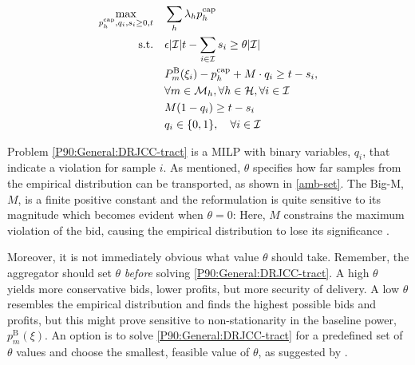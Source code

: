\documentclass[conference]{IEEEtran}
\begin{document}
\begin{subequations}\label{P90:General:DRJCC-tract}
    \begin{align}
        \max_{p_{h}^{\text{cap}}, q_i, s_i \geq 0, t} \quad & \sum_h \lambda_h p_{h}^{\text{cap}}                                                                                                                                    \\
        \text{s.t.} \quad                                   & \epsilon |\mathcal{I}| t - \sum_{i \in \mathcal{I}} s_i \geq \theta |\mathcal{I}|                                                                                      \\
                                                            & P_{m}^{\text{B}}(\xi_i) - p_{h}^{\text{cap}} + M\cdot q_i \geq t - s_i, \notag \\
                                                            &  \forall{m} \in \mathcal{M}_{h},  \forall{h} \in \mathcal{H},  \forall{i} \in \mathcal{I} \\
                                                            & M (1-q_i) \geq t - s_i                                                                                                                                                 \\
                                                            & q_i \in \{0,1 \}, \quad \forall{i} \in \mathcal{I}
    \end{align}
\end{subequations}

Problem \eqref{P90:General:DRJCC-tract} is a \ac{MILP} with binary variables, $q_{i}$, that indicate a violation for sample $i$. As mentioned, $\theta$ specifies how far samples from the empirical distribution can be transported, as shown in \eqref{amb-set}. The Big-M, $M$, is a finite positive constant and the reformulation is quite sensitive to its magnitude which becomes evident when $\theta = 0$: Here, $M$ constrains the maximum violation of the bid, causing the empirical distribution to lose its significance \cite[Theorem 2, Remark 1]{chen2022data}.

Moreover, it is not immediately obvious what value $\theta$ should take. Remember, the aggregator should set $\theta$ \textit{before} solving \eqref{P90:General:DRJCC-tract}. A high $\theta$ yields more conservative bids, lower profits, but more security of delivery. A low $\theta$ resembles the empirical distribution and finds the highest possible bids and profits, but this might prove sensitive to non-stationarity in the baseline power, $p_{m}^{\text{B}}(\xi)$. An option is to solve \eqref{P90:General:DRJCC-tract} for a predefined set of $\theta$ values and choose the smallest, feasible value of $\theta$, as suggested by \cite[Section 3.2]{chen2022data}.
\end{document}
